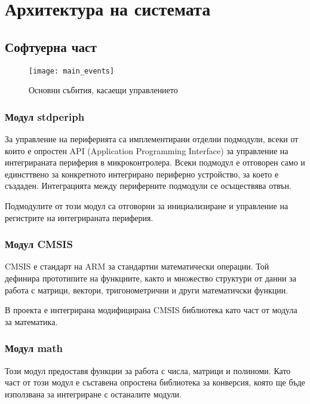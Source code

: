 \section{Архитектура на системата}



\subsection{Софтуерна част}

\begin{figure}[htpb!]
    \centering
    \texttt{[image: main\_events]}
    \caption{Основни събития, касаещи управлението}
    \label{fig:main_events}
\end{figure}


\subsubsection{Модул stdperiph}

За управление на периферията са имплементирани отделни подмодули, всеки от които
е опростен API (Application Programming Interface) за управление на 
интегрираната периферия в микроконтролера. Всеки подмодул е отговорен само и
единсттвено за конкретното интегрирано периферно устройство, за което е създаден.
Интеграцията между периферните подмодули се осъществява отвън.

Подмодулите от този модул са отговорни за инициализиране и управление на
регистрите на интегрираната периферия. 

\subsubsection{Модул CMSIS}

CMSIS е стандарт на ARM за стандартни математически операции.
Той дефинира прототипите на функциите, както и множество
структури от данни за работа с матрици, вектори, тригонометрични и 
други математичски функции.

В проекта е интегрирана модифицирана CMSIS библиотека 
като част от модула за математика.

\subsubsection{Модул math}

Този модул предоставя функции за работа с числа, матрици и полиноми.
Като част от този модул е съставена опростена библиотека за конверсия,
която ще бъде използвана за интегриране с останалите модули.

